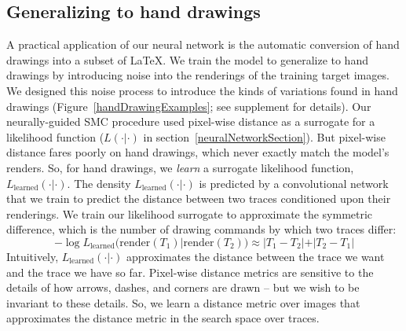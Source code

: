 \documentclass{article}
\begin{document}
\subsection{Generalizing to hand drawings}
A practical application of our neural network is the automatic conversion of hand drawings into a subset of \LaTeX.
 We train the model
to generalize to hand drawings by introducing noise into the
renderings of the training target images.
We designed this noise process to introduce the kinds of variations found in hand drawings (Figure~\ref{handDrawingExamples}; see supplement for details).
Our neurally-guided SMC procedure
used pixel-wise distance as a surrogate for a likelihood function ($L(\cdot|\cdot)$ in section~\ref{neuralNetworkSection}).
But pixel-wise distance fares poorly on hand drawings, which never exactly match
the model's renders.
So, for hand drawings,
we \emph{learn} a surrogate likelihood function,
$L_{\text{learned}}(\cdot|\cdot)$.
The density $L_{\text{learned}}(\cdot|\cdot)$ is predicted by a convolutional network that we train to predict
the distance between two traces conditioned upon their renderings.
We train our likelihood surrogate to approximate the symmetric difference,
which is  the number of drawing commands by which two traces differ:
\begin{equation}
-\log L_{\text{learned}}(\text{render}(T_1)|\text{render}(T_2))\approx |T_1 - T_2| + |T_2 - T_1|\label{symmetricDistance}
\end{equation}
Intuitively,
$L_{\text{learned}}(\cdot|\cdot)$ approximates the distance between
the trace we want and the trace we have so far.  Pixel-wise distance
metrics are sensitive to the details of how
arrows, dashes, and corners are drawn -- but we wish to be invariant
to these details. So, we learn a distance metric over images that
approximates the distance metric in the search space over traces.
\end{document}
